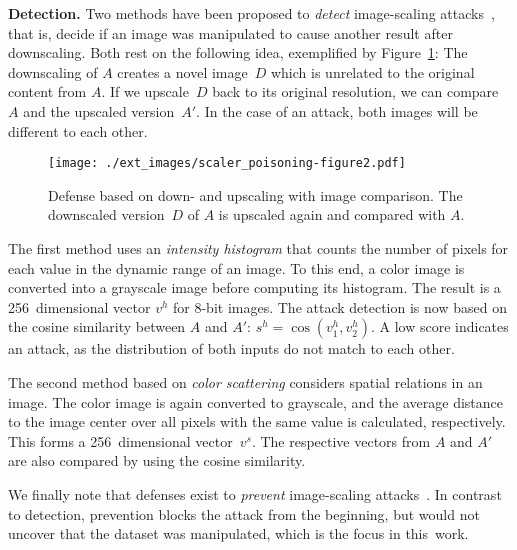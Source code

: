 \documentclass[conference]{IEEEtran}
\renewcommand{\paragraph}[1]{{\vskip 8pt \noindent\bf #1 }}
\newcommand{\attimg}{\ensuremath{A}\xspace}
\newcommand{\outimg}{\ensuremath{D}\xspace}
\begin{document}
\paragraph{Detection.}
Two methods have been proposed to \emph{detect} image-scaling 
attacks~\citep{XiaCheShe+19}, that is, decide if an image was 
manipulated to cause another result after downscaling.
Both rest on the following idea, exemplified by 
Figure~\ref{fig:defenses_detection_example}: The downscaling of \attimg 
creates a novel image~\outimg which is unrelated to the original 
content from \attimg. If we upscale~\outimg back to its original 
resolution, we can compare \attimg and the upscaled 
version~$\attimg'$. In the case of an attack, both images will be 
different to each other.

\begin{figure}[h]
	\centering
	\texttt{[image: ./ext\_images/scaler\_poisoning-figure2.pdf]}
	\vspace{-0.4em}
	\caption{Defense based on down- and upscaling with image comparison.
		The downscaled version~\outimg of \attimg is upscaled again and
		compared with \attimg.}
	\label{fig:defenses_detection_example}
\end{figure}

The first method {uses\EndAccSupp{}} an \emph{intensity histogram} that counts 
the number of pixels for each value in the dynamic range of an image. 
To this end, a color image is converted into a grayscale
image before computing its histogram. The result is a 256~dimensional 
vector $v^h$ for 8-bit images.
The attack detection is now {based\EndAccSupp{}} on the cosine {similarity\EndAccSupp{}} 
between $\attimg$ and $\attimg'$: $s^h = \cos (v^h_1, v^h_{2} )$. A 
low {score\EndAccSupp{}} indicates an attack, as the {distribution\EndAccSupp{}} of both inputs do 
not match to each other.

The second method {based\EndAccSupp{}} on \emph{color scattering} considers spatial 
relations in an image. The color image is again converted to 
grayscale, and the {average\EndAccSupp{}} distance to the image center over 
all pixels with the same value is calculated, respectively. This forms 
a 256~dimensional vector~$v^s$. The respective vectors from $\attimg$ 
and $\attimg'$ are also compared by using the cosine similarity.

We finally note that defenses exist to \emph{prevent} 
image-scaling attacks~\citep[see][]{QuiKleArp20}. 
In contrast to detection, prevention blocks the attack from 
the beginning, but would not uncover that the dataset was 
manipulated, which is the focus in this~work.
\end{document}
